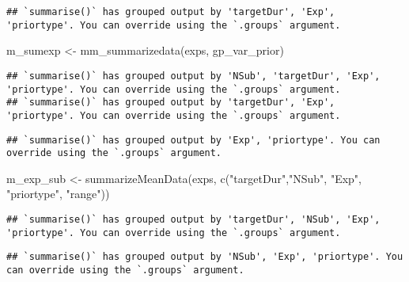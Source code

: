 \documentclass[
]{article}
\newenvironment{Shaded}{\begin{snugshade}}{\end{snugshade}}
\newcommand{\FunctionTok}[1]{\textcolor[rgb]{0.00,0.00,0.00}{#1}}
\newcommand{\NormalTok}[1]{#1}
\newcommand{\OtherTok}[1]{\textcolor[rgb]{0.56,0.35,0.01}{#1}}
\newcommand{\StringTok}[1]{\textcolor[rgb]{0.31,0.60,0.02}{#1}}
\begin{document}
\begin{verbatim}
## `summarise()` has grouped output by 'targetDur', 'Exp', 'priortype'. You can override using the `.groups` argument.
\end{verbatim}

\begin{Shaded}
\begin{Highlighting}[]
\NormalTok{m\_sumexp }\OtherTok{\textless{}{-}}  \FunctionTok{mm\_summarizedata}\NormalTok{(exps, gp\_var\_prior)}
\end{Highlighting}
\end{Shaded}

\begin{verbatim}
## `summarise()` has grouped output by 'NSub', 'targetDur', 'Exp', 'priortype'. You can override using the `.groups` argument.
## `summarise()` has grouped output by 'targetDur', 'Exp', 'priortype'. You can override using the `.groups` argument.
\end{verbatim}

\begin{verbatim}
## `summarise()` has grouped output by 'Exp', 'priortype'. You can override using the `.groups` argument.
\end{verbatim}

\begin{Shaded}
\begin{Highlighting}[]
\NormalTok{m\_exp\_sub }\OtherTok{\textless{}{-}} \FunctionTok{summarizeMeanData}\NormalTok{(exps, }\FunctionTok{c}\NormalTok{(}\StringTok{"targetDur"}\NormalTok{,}\StringTok{"NSub"}\NormalTok{, }\StringTok{"Exp"}\NormalTok{, }\StringTok{"priortype"}\NormalTok{, }\StringTok{"range"}\NormalTok{))}
\end{Highlighting}
\end{Shaded}

\begin{verbatim}
## `summarise()` has grouped output by 'targetDur', 'NSub', 'Exp', 'priortype'. You can override using the `.groups` argument.
\end{verbatim}

\begin{verbatim}
## `summarise()` has grouped output by 'NSub', 'Exp', 'priortype'. You can override using the `.groups` argument.
\end{verbatim}
\end{document}
